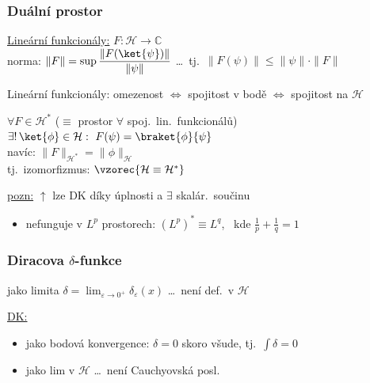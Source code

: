 \documentclass[11pt,a4paper]{article}
\begin{document}
\subsubsection*{Duální prostor }
\underline{Lineární funkcionály:} \quad $F:\mathcal{H}\to\mathbb{C}$ \\
\quad norma: \quad $\|F\| = \sup\dfrac{\|F(\ket{\psi})\|}{\|\psi\|}$ \quad \dots\ tj.\ $\|F(\psi)\| \leq \|\psi\|\cdot\|F\|$

Lineární funkcionály: \quad omezenost $\Leftrightarrow$ spojitost v bodě $\Leftrightarrow$ spojitost na $\mathcal{H}$

\begin{veta}
$\forall F\in\mathcal{H}^*$ ($\equiv$ prostor $\forall$ spoj.\ lin.\ funkcionálů) \ $\exists!\,\ket{\phi}\in\mathcal{H}:\ F(\psi) = \braket{\phi}{\psi}$ \\
navíc: \quad $\|F\|_{\mathcal{H}^*} = \|\phi\|_{\mathcal{H}}$ \\
tj.\ izomorfizmus: \quad $\vzorec{\mathcal{H}\equiv\mathcal{H}^*}$
\end{veta}

\underline{pozn:} $\uparrow$ lze DK díky úplnosti a $\exists$ skalár.\ součinu
\begin{itemize}[nosep]
  \item[--] nefunguje v $L^p$ prostorech: \quad $(L^p)^* \equiv L^q$, \ kde $\frac1p + \frac1q = 1$
\end{itemize}

\subsubsection*{Diracova $\delta$-funkce}
jako limita \quad $\delta = \lim_{\varepsilon\to 0^+}\delta_\varepsilon(x)$ \quad \dots\ není def.\ v $\mathcal{H}$

\underline{DK:}
\begin{itemize}[nosep]
  \item[--] jako bodová konvergence: $\delta = 0$ skoro všude, tj.\ $\int\delta = 0$
  \item[--] jako lim v $\mathcal{H}$ \dots\ není Cauchyovská posl.
\end{itemize}

\begin{minipage}{0.6\textwidth}
 \\
\end{minipage}
\begin{minipage}{0.38\textwidth}
\end{minipage}
\end{document}
